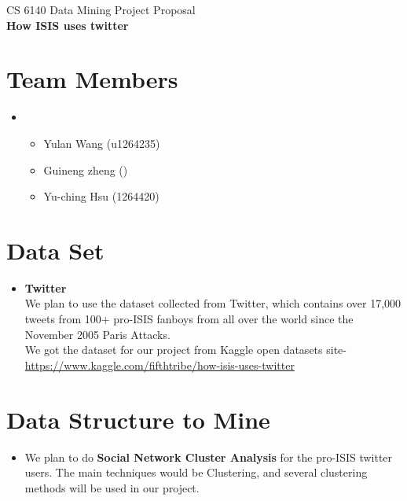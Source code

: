 \documentclass[11pt]{exam}
\begin{document}
\begingroup
\fontsize{16pt}{30pt}\selectfont
\begin{center}  
CS 6140 Data Mining Project Proposal \\
\textbf{How ISIS uses twitter } \\
\end{center}  
\endgroup


\section{Team Members}

\begin{itemize}
\item[]

\begin{itemize}
	\item Yulan Wang (u1264235)
	\item Guineng zheng ()
	\item Yu-ching Hsu (1264420)
\end{itemize}

\end{itemize}
\section{Data Set}

\begin{itemize}
\item[] 
\textbf{Twitter}\\
We plan to use the dataset collected from Twitter, which contains over 17,000 tweets from 100+ pro-ISIS fanboys from all over the world since the November 2005 Paris Attacks.   \\
We got the dataset for our project from Kaggle open datasets site-\\ \url{https://www.kaggle.com/fifthtribe/how-isis-uses-twitter}

\end{itemize}
\section{Data Structure to Mine}

\begin{itemize}

\item[] We plan to do \textbf{Social Network Cluster Analysis} for the pro-ISIS twitter users. The main techniques would be Clustering, and several clustering methods will be used in our project.

\end{itemize}
\end{document}

